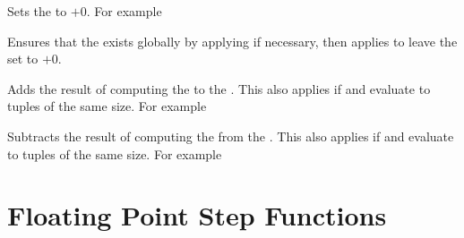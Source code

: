 \documentclass[oneside]{book}
\begin{document}
\begin{function}{\fpZero}
\begin{syntax}
 
\end{syntax}
Sets the  to $+0$. For example
\begin{demohigh}
\fpSet {}
\fpZero \lTmpaFp
\fpUse \lTmpaFp
\end{demohigh}
\end{function}

\begin{function}{\fpZeroNew}
\begin{syntax}
 
\end{syntax}
Ensures that the  exists globally
by applying  if necessary, then applies
 to leave the  set to $+0$.
\end{function}

\begin{function}{\fpAdd}
\begin{syntax}
  
\end{syntax}
Adds the result of computing the  to
the .
This also applies if  and  evaluate to tuples of the same size. For example
\begin{demohigh}
\fpSet {}
\fpAdd {}
\fpUse \lTmpaFp
\end{demohigh}
\end{function}

\begin{function}{\fpSub}
\begin{syntax}
  
\end{syntax}
Subtracts the result of computing the  from the .
This also applies if  and  evaluate to tuples of the same size. For example
\begin{demohigh}
\fpSet {}
\fpSub {}
\fpUse \lTmpaFp
\end{demohigh}
\end{function}

\section{Floating Point Step Functions}
\end{document}
